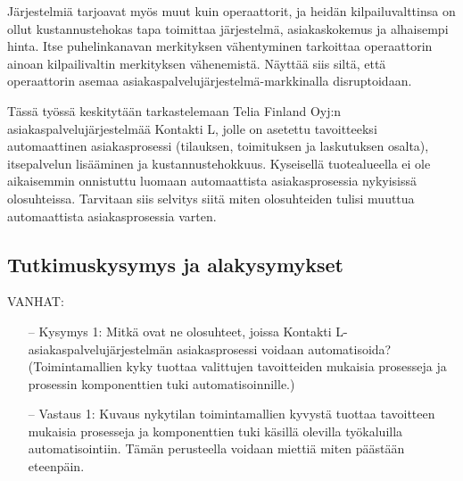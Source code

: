 \documentclass[finnish,12pt,a4paper,pdftex]{article}
\begin{document}
Järjestelmiä tarjoavat myös muut kuin operaattorit, ja heidän kilpailuvalttinsa on ollut kustannustehokas tapa toimittaa järjestelmä, asiakaskokemus ja alhaisempi hinta. Itse puhelinkanavan merkityksen vähentyminen tarkoittaa operaattorin ainoan kilpailivaltin merkityksen vähenemistä. Näyttää siis siltä, että operaattorin asemaa asiakaspalvelujärjestelmä-markkinalla disruptoidaan. 

Tässä työssä keskitytään tarkastelemaan
Telia Finland Oyj:n asiakaspalvelujärjestelmää Kontakti L, jolle on asetettu tavoitteeksi automaattinen asiakasprosessi (tilauksen, toimituksen ja laskutuksen osalta), itsepalvelun lisääminen ja kustannustehokkuus. Kyseisellä tuotealueella ei ole aikaisemmin onnistuttu luomaan automaattista asiakasprosessia nykyisissä olosuhteissa. Tarvitaan siis selvitys siitä miten olosuhteiden tulisi muuttua automaattista asiakasprosessia varten.

\subsection{Tutkimuskysymys ja alakysymykset}

VANHAT:\\
\begin{itemize}
\item[--]Kysymys 1: Mitkä ovat ne olosuhteet, joissa Kontakti L- asiakaspalvelujärjestelmän asiakasprosessi voidaan automatisoida? (Toimintamallien kyky tuottaa valittujen tavoitteiden mukaisia prosesseja ja prosessin komponenttien tuki automatisoinnille.)
\item[--]Vastaus 1: Kuvaus nykytilan toimintamallien kyvystä tuottaa tavoitteen mukaisia prosesseja ja komponenttien tuki käsillä olevilla työkaluilla automatisointiin. Tämän perusteella voidaan miettiä miten päästään eteenpäin.
\end{itemize}
\end{document}
